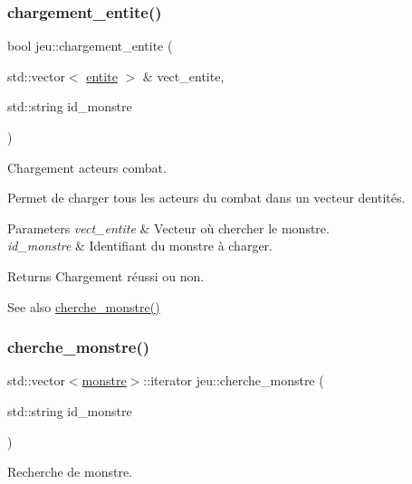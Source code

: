 \subsubsection{\texorpdfstring{chargement\+\_\+entite()}{chargement\_entite()}}
{\footnotesize\ttfamily bool jeu\+::chargement\+\_\+entite (\begin{DoxyParamCaption}\item[{std\+::vector$<$ \hyperlink{classentite}{entite} $>$ \&}]{vect\+\_\+entite,  }\item[{std\+::string}]{id\+\_\+monstre }\end{DoxyParamCaption})}



Chargement acteurs combat. 

Permet de charger tous les acteurs du combat dans un vecteur d\textquotesingle{}entités. 
\begin{DoxyParams}{Parameters}
{\em vect\+\_\+entite} & Vecteur où chercher le monstre. \\
\hline
{\em id\+\_\+monstre} & Identifiant du monstre à charger. \\
\hline
\end{DoxyParams}
\begin{DoxyReturn}{Returns}
Chargement réussi ou non. 
\end{DoxyReturn}
\begin{DoxySeeAlso}{See also}
\hyperlink{classjeu_af3a81d9b899b204b4b304821c5bee43b}{cherche\+\_\+monstre()} 
\end{DoxySeeAlso}
\mbox{\label{classjeu_af3a81d9b899b204b4b304821c5bee43b}} 
\subsubsection{\texorpdfstring{cherche\+\_\+monstre()}{cherche\_monstre()}}
{\footnotesize\ttfamily std\+::vector$<$\hyperlink{classmonstre}{monstre}$>$\+::iterator jeu\+::cherche\+\_\+monstre (\begin{DoxyParamCaption}\item[{std\+::string}]{id\+\_\+monstre }\end{DoxyParamCaption})}



Recherche de monstre. 

